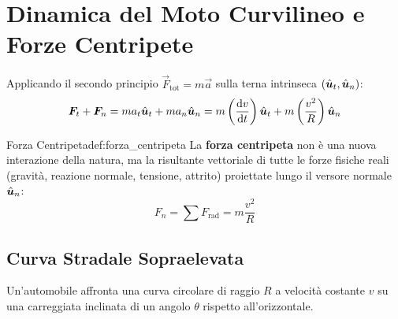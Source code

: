 \section{Dinamica del Moto Curvilineo e Forze Centripete}
\label{sec:dinamica_curvilinea}

Applicando il secondo principio $\vec{F}_{\text{tot}} = m\vec{a}$ sulla terna intrinseca $(\hat{\bm{u}}_t, \hat{\bm{u}}_n)$:
\begin{equation}
    \bm{F}_t + \bm{F}_n = m a_t \hat{\bm{u}}_t + m a_n \hat{\bm{u}}_n = m\left(\frac{\mathrm{d} v}{\mathrm{d} t}\right)\hat{\bm{u}}_t + m\left(\frac{v^2}{R}\right)\hat{\bm{u}}_n
\end{equation}

\begin{definizione}{Forza Centripeta}{def:forza_centripeta}
La \textbf{forza centripeta} non è una nuova interazione della natura, ma la risultante vettoriale di tutte le forze fisiche reali (gravità, reazione normale, tensione, attrito) proiettate lungo il versore normale $\hat{\bm{u}}_n$:
\begin{equation}
    F_n = \sum F_{\text{rad}} = m\frac{v^2}{R}
    \label{eq:forza_centripeta}
\end{equation}
\end{definizione}

\subsection{Curva Stradale Sopraelevata}
Un'automobile affronta una curva circolare di raggio $R$ a velocità costante $v$ su una carreggiata inclinata di un angolo $\theta$ rispetto all'orizzontale.

\begin{center}
\end{center}

